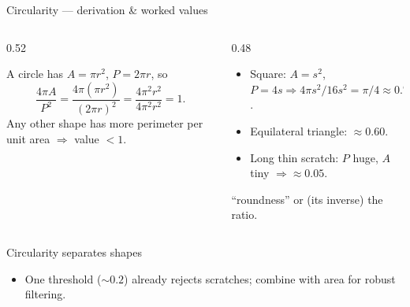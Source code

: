 \documentclass[10pt,aspectratio=169]{beamer}
\begin{document}
\begin{frame}{Circularity — derivation \& worked values}
  \begin{columns}[T]
    \begin{column}{0.52\textwidth}
      \begin{mathbox}[Why $4\pi A/P^2$?]
        A circle has $A=\pi r^2$, $P=2\pi r$, so
        \[ \frac{4\pi A}{P^2}=\frac{4\pi(\pi r^2)}{(2\pi r)^2}=\frac{4\pi^2 r^2}{4\pi^2 r^2}=1. \]
        Any other shape has more perimeter per unit area $\Rightarrow$ value $<1$.
      \end{mathbox}
    \end{column}
    \begin{column}{0.48\textwidth}
      \begin{itemize}\scriptsize
        \item Square: $A=s^2$, $P=4s\Rightarrow 4\pi s^2/16s^2=\pi/4\approx\mathbf{0.79}$.
        \item Equilateral triangle: $\approx\mathbf{0.60}$.
        \item Long thin scratch: $P$ huge, $A$ tiny $\Rightarrow \approx\mathbf{0.05}$.
      \end{itemize}
      \begin{infobox}
        ``roundness'' or (its inverse) the  ratio.
      \end{infobox}
    \end{column}
  \end{columns}
\end{frame}

\begin{frame}{Circularity separates shapes}
  \begin{center}
  \end{center}
  \begin{itemize}\scriptsize
    \item One threshold ($\sim 0.2$) already rejects scratches; combine with area for robust filtering.
  \end{itemize}
\end{frame}
\end{document}
